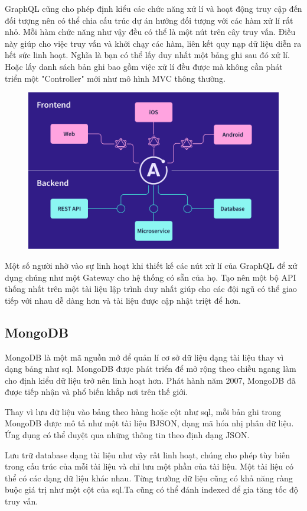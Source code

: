 {{GraphQL cũng cho phép định kiểu các chức năng xử lí và hoạt động truy cập đến đối tượng nên có thể chia cấu trúc dự án hướng đối tượng với các hàm xử lí rất nhỏ. Mỗi hàm chức năng như vậy đều có thể là một nút trên cây truy vấn. Điều này giúp cho việc truy vấn và khởi chạy các hàm, liên kết quy nạp dữ liệu diễn ra hết sức linh hoạt. Nghĩa là bạn có thể lấy duy nhất một bảng ghi sau đó xử lí. Hoặc lấy danh sách bản ghi bao gồm việc xử lí đều được mà không cần phát triển một "Controller" mới như mô hình MVC thông thường.

\begin{figure}
	\centering
	\includegraphics[width=0.7\linewidth]{images/apollo-server}
	\caption[Kiến trúc Apollo Server]{}
	\label{fig:apollo-server}
\end{figure}

Một số người nhờ vào sự linh hoạt khi thiết kế các nút xử lí của GraphQL để xử dụng chúng như một Gateway cho hệ thống có sẵn của họ. Tạo nên một bộ API thống nhất trên một tài liệu lập trình duy nhất giúp cho các đội ngũ có thể giao tiếp với nhau dễ dàng hơn và tài liệu được cập nhật triệt để hơn.

\subsection{MongoDB}
MongoDB là một mã nguồn mở để quản lí cơ sở dữ liệu dạng tài liệu thay vì dạng bảng như \acrshort{sql}. MongoDB được phát triển để mở rộng theo chiều ngang làm cho định kiểu dữ liệu trở nên linh hoạt hơn. Phát hành năm 2007, MongoDB đã được tiếp nhận và phổ biến khắp nơi trên thế giới.

Thay vì lưu dữ liệu vào bảng theo hàng hoặc cột như \acrshort{sql}, mỗi bản ghi trong MongoDB được mô tả như một tài liệu BJSON, dạng mã hóa nhị phân dữ liệu. Ứng dụng có thể duyệt qua những thông tin theo định dạng JSON.

Lưu trữ database dạng tài liệu như vậy rất linh hoạt, chúng cho phép tùy biến trong cấu trúc của mỗi tài liệu và chỉ lưu một phần của tài liệu. Một tài liệu có thể có các dạng dữ liệu khác nhau. Từng trường dữ liệu cũng có khả năng ràng buộc giá trị như một cột của \acrshort{sql}.Ta cũng có thể đánh indexed để gia tăng tốc độ truy vấn.

}}
